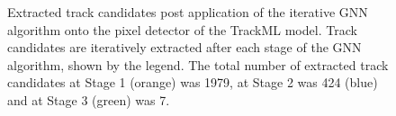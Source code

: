 \begin{figure}[htbp]%
    \centering
    \hfill
    \centering
    \caption{Extracted track candidates post application of the iterative GNN algorithm onto the pixel detector of the TrackML model. Track candidates are iteratively extracted after each stage of the GNN algorithm, shown by the legend. The total number of extracted track candidates at Stage 1 (orange) was 1979, at Stage 2 was 424 (blue) and at Stage 3 (green) was 7.}%
    \label{fig:trackml-results-barrel-endcap}%
\end{figure}






